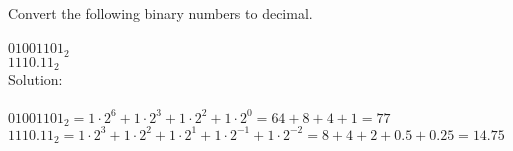 Convert the following binary numbers to decimal. \\
\\
$01001101_2$ \\
$1110.11_2$ \\

Solution: \\
\\
$01001101_2 = 1 \cdot 2^6 + 1 \cdot 2^3 + 1 \cdot 2^2 + 1 \cdot 2^0 = 64 + 8 + 4 + 1 = 77$ \\
$1110.11_2 = 1 \cdot 2^3 + 1 \cdot 2^2 + 1 \cdot 2^1 + 1 \cdot 2^{-1} + 1 \cdot 2^{-2} = 8 + 4 + 2 + 0.5 + 0.25 = 14.75$ \\
